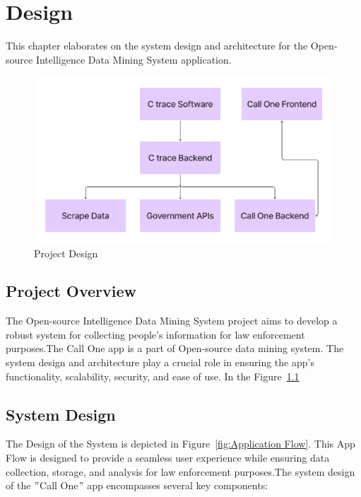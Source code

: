 \chapter{Design}\label{ch:design}
\justify

This chapter elaborates on the system design and architecture for the Open-source Intelligence Data Mining System application.


\begin{figure}
    \centering
    \includegraphics[width=1\linewidth]{Media//Chapter 4//img}
    \caption{Project Design}
    \label{fig:Project Design}
\end{figure}


\section{Project Overview}\label{sec:project-overview}

The Open-source Intelligence Data Mining System project aims to develop a robust system for collecting people's information for law enforcement purposes.The Call One app is a part of Open-source data mining system.
The system design and architecture play a crucial role in ensuring the app's functionality, scalability, security, and ease of use.
In the Figure~\ref{fig:Project Design}

\section{System Design}\label{sec:system-design}

The Design of the System is depicted in Figure~\ref{fig:Application Flow}.
This App Flow is designed to provide a seamless user experience while ensuring data collection, storage, and analysis for law enforcement purposes.The system design of the \("\)Call One\("\) app encompasses several key components:

